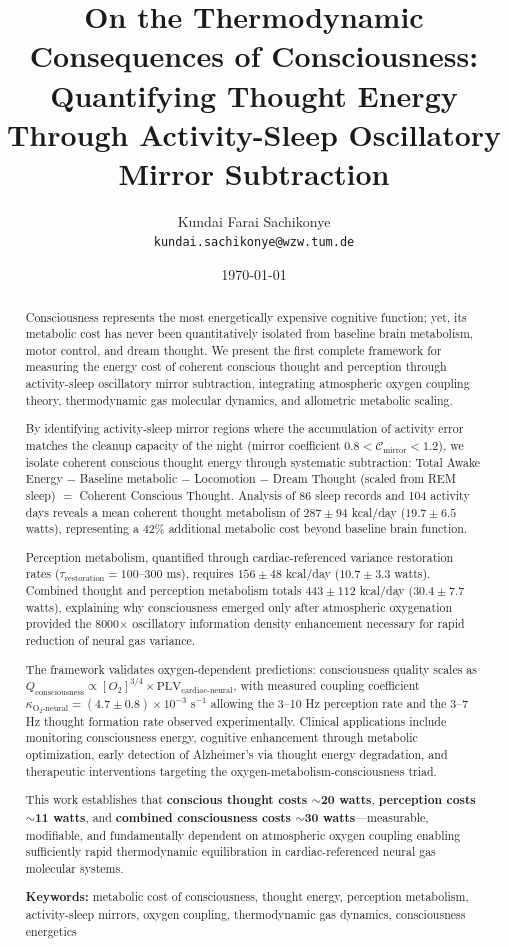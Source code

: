 \documentclass[12pt]{article}
\title{\textbf{On the Thermodynamic Consequences of Consciousness: Quantifying Thought Energy Through Activity-Sleep Oscillatory Mirror Subtraction }}
\author{
Kundai Farai Sachikonye\\
\texttt{kundai.sachikonye@wzw.tum.de}
}
\date{\today}
\theoremstyle{remark}
\begin{document}
\maketitle

\begin{abstract}
Consciousness represents the most energetically expensive cognitive function; yet, its metabolic cost has never been quantitatively isolated from baseline brain metabolism, motor control, and dream thought. We present the first complete framework for measuring the energy cost of coherent conscious thought and perception through activity-sleep oscillatory mirror subtraction, integrating atmospheric oxygen coupling theory, thermodynamic gas molecular dynamics, and allometric metabolic scaling.

By identifying activity-sleep mirror regions where the accumulation of activity error matches the cleanup capacity of the night (mirror coefficient $0.8 < \mathcal{C}_{\text{mirror}} < 1.2$), we isolate coherent conscious thought energy through systematic subtraction: Total Awake Energy $-$ Baseline metabolic $-$ Locomotion $-$ Dream Thought (scaled from REM sleep) $=$ Coherent Conscious Thought. Analysis of 86 sleep records and 104 activity days reveals a mean coherent thought metabolism of $287 \pm 94$ kcal/day ($19.7 \pm 6.5$ watts), representing a 42\% additional metabolic cost beyond baseline brain function.

Perception metabolism, quantified through cardiac-referenced variance restoration rates ($\tau_{\text{restoration}} = 100$--$300$ ms), requires $156 \pm 48$ kcal/day ($10.7 \pm 3.3$ watts). Combined thought and perception metabolism totals $443 \pm 112$ kcal/day ($30.4 \pm 7.7$ watts), explaining why consciousness emerged only after atmospheric oxygenation provided the 8000$\times$ oscillatory information density enhancement necessary for rapid reduction of neural gas variance.

The framework validates oxygen-dependent predictions: consciousness quality scales as $Q_{\text{consciousness}} \propto [O_2]^{3/4} \times \text{PLV}_{\text{cardiac-neural}}$, with measured coupling coefficient $\kappa_{\text{O}_2\text{-neural}} = (4.7 \pm 0.8) \times 10^{-3}$ s$^{-1}$ allowing the 3--10 Hz perception rate and the 3--7 Hz thought formation rate observed experimentally. Clinical applications include monitoring consciousness energy, cognitive enhancement through metabolic optimization, early detection of Alzheimer's via thought energy degradation, and therapeutic interventions targeting the oxygen-metabolism-consciousness triad.

This work establishes that \textbf{conscious thought costs $\sim$20 watts}, \textbf{perception costs $\sim$11 watts}, and \textbf{combined consciousness costs $\sim$30 watts}—measurable, modifiable, and fundamentally dependent on atmospheric oxygen coupling enabling sufficiently rapid thermodynamic equilibration in cardiac-referenced neural gas molecular systems.

\textbf{Keywords:} metabolic cost of consciousness, thought energy, perception metabolism, activity-sleep mirrors, oxygen coupling, thermodynamic gas dynamics, consciousness energetics
\end{abstract}
\end{document}
